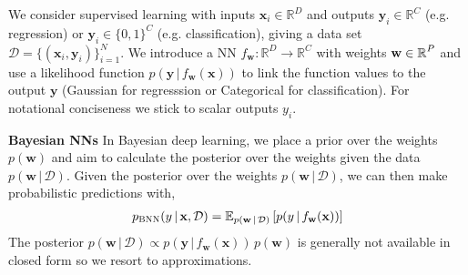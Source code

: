 \documentclass{article}
\newcommand{\dataset}{\ensuremath{\mathcal{D}}}
\newcommand{\inputDomain}{\ensuremath{\mathbb{R}^{D}}}
\newcommand{\outputDomain}{\ensuremath{\mathbb{R}^{C}}}
\newcommand{\weights}{\ensuremath{\mathbf{w}}}
\newcommand{\mbf}[1]{\mathbf{#1}}
\renewcommand{\mid}{\,|\,}
\newcommand{\vx}{\mbf{x}}
\newcommand{\vy}{\mbf{y}}
\newcommand{\vw}{\mbf{w}}
\begin{document}

We consider supervised learning with inputs $\vx_i \in \inputDomain$ and outputs $\vy_i \in \outputDomain$ (e.g. regression) or $\vy_{i} \in \{0,1\}^{C}$ (e.g. classification),
giving a data set $\dataset = \{(\vx_{i} , \vy_{i})\}_{i=1}^{N}$.
We introduce a  NN $f_\mathbf{w}: \inputDomain \to \outputDomain$ with weights $\weights \in \R^{P}$ and use a likelihood function $p(\vy \mid f_\mathbf{w}(\vx))$
to link the function values to the output $\vy$ (Gaussian for regresssion or Categorical for classification).
For notational conciseness we stick to scalar outputs $y_{i}$.

\textbf{Bayesian NNs}
In Bayesian deep learning, we place a prior over the weights $p(\vw)$ and aim to calculate the posterior over the weights given the data $p(\vw \mid \mathcal{D})$.
Given the posterior over the weights $p(\vw \mid \mathcal{D})$, we can then make probabilistic predictions with,
\begin{align} \label{eq-predictions}
  p_{\text{\sc BNN}}(y \mid \vx, \mathcal{D}) = \E_{p(\vw \mid \mathcal{D})} \left[ p(y \mid f_{\vw}(\vx)) \right]
\end{align}
The posterior ${p(\vw \mid \dataset) \propto p(\vy \mid f_{\weights}(\vx)) \, p(\weights)}$ is generally not available in closed form
so we resort to approximations.
\end{document}
